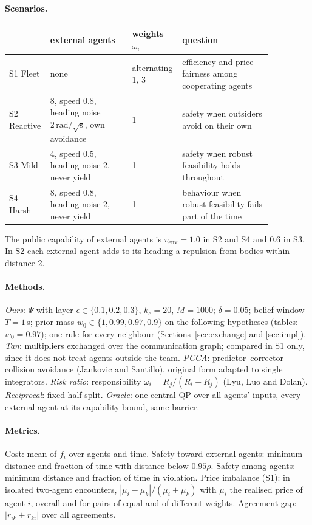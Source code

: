 \documentclass[11pt]{article}
\theoremstyle{definition}
\theoremstyle{remark}
\begin{document}
\paragraph{Scenarios.}
\begin{center}
\small
\begin{tabular}{>{\raggedright}p{0.1\linewidth}>{\raggedright}p{0.3\linewidth}>{\raggedright}p{0.13\linewidth}>{\raggedright\arraybackslash}p{0.33\linewidth}}
\toprule
 & external agents & weights $\omega_i$ & question\\
\midrule
S1 Fleet & none & alternating 1, 3 & efficiency and price fairness among cooperating agents\\
S2 Reactive & 8, speed 0.8, heading noise $2\,\mathrm{rad}/\sqrt{\mathrm s}$, own avoidance & 1 & safety when outsiders avoid on their own\\
S3 Mild & 4, speed 0.5, heading noise 2, never yield & 1 & safety when robust feasibility holds throughout\\
S4 Harsh & 8, speed 0.8, heading noise 2, never yield & 1 & behaviour when robust feasibility fails part of the time\\
\bottomrule
\end{tabular}
\end{center}
The public capability of external agents is $v_{\mathrm{env}}=1.0$ in S2 and S4 and $0.6$ in S3. In S2 each external agent adds to its heading a repulsion from bodies within distance $2$.

\paragraph{Methods.} \emph{Ours}: $\Psi$ with layer $\epsilon\in\{0.1,0.2,0.3\}$, $k_e=20$, $M=1000$; $\delta=0.05$; belief window $T=1$\,s; prior mass $w_0\in\{1,0.99,0.97,0.9\}$ on the following hypotheses (tables: $w_0=0.97$); one rule for every neighbour (Sections~\ref{sec:exchange} and \ref{sec:impl}). \emph{Tan}: multipliers exchanged over the communication graph; compared in S1 only, since it does not treat agents outside the team. \emph{PCCA}: predictor--corrector collision avoidance (Jankovic and Santillo), original form adapted to single integrators. \emph{Risk ratio}: responsibility $\omega_i=R_j/(R_i+R_j)$ (Lyu, Luo and Dolan). \emph{Reciprocal}: fixed half split. \emph{Oracle}: one central QP over all agents' inputs, every external agent at its capability bound, same barrier.

\paragraph{Metrics.} Cost: mean of $f_i$ over agents and time. Safety toward external agents: minimum distance and fraction of time with distance below $0.95\rho$. Safety among agents: minimum distance and fraction of time in violation. Price imbalance (S1): in isolated two-agent encounters, $|\mu_i-\mu_k|/(\mu_i+\mu_k)$ with $\mu_i$ the realised price of agent $i$, overall and for pairs of equal and of different weights. Agreement gap: $|r_{ik}+r_{ki}|$ over all agreements.
\end{document}
